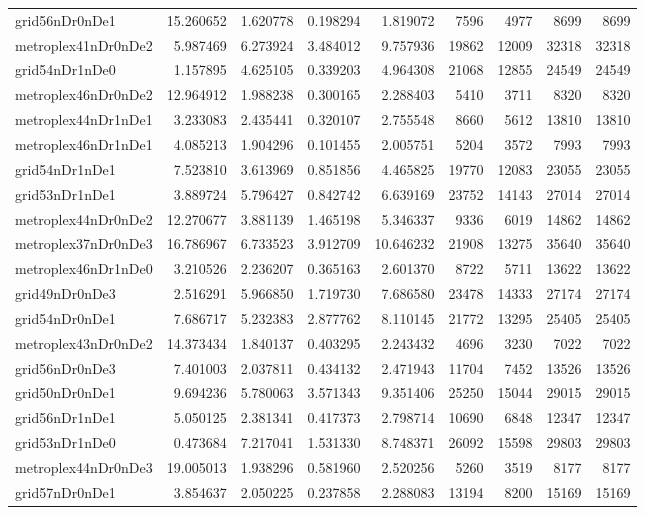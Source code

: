 \begin{longtable}{|l|r|r|r|r|r|r|r|r|}
grid56nDr0nDe1 & 15.260652 & 1.620778 & 0.198294 & 1.819072 & 7596 & 4977 & 8699 & 8699 \\
metroplex41nDr0nDe2 & 5.987469 & 6.273924 & 3.484012 & 9.757936 & 19862 & 12009 & 32318 & 32318 \\
grid54nDr1nDe0 & 1.157895 & 4.625105 & 0.339203 & 4.964308 & 21068 & 12855 & 24549 & 24549 \\
metroplex46nDr0nDe2 & 12.964912 & 1.988238 & 0.300165 & 2.288403 & 5410 & 3711 & 8320 & 8320 \\
metroplex44nDr1nDe1 & 3.233083 & 2.435441 & 0.320107 & 2.755548 & 8660 & 5612 & 13810 & 13810 \\
metroplex46nDr1nDe1 & 4.085213 & 1.904296 & 0.101455 & 2.005751 & 5204 & 3572 & 7993 & 7993 \\
grid54nDr1nDe1 & 7.523810 & 3.613969 & 0.851856 & 4.465825 & 19770 & 12083 & 23055 & 23055 \\
grid53nDr1nDe1 & 3.889724 & 5.796427 & 0.842742 & 6.639169 & 23752 & 14143 & 27014 & 27014 \\
metroplex44nDr0nDe2 & 12.270677 & 3.881139 & 1.465198 & 5.346337 & 9336 & 6019 & 14862 & 14862 \\
metroplex37nDr0nDe3 & 16.786967 & 6.733523 & 3.912709 & 10.646232 & 21908 & 13275 & 35640 & 35640 \\
metroplex46nDr1nDe0 & 3.210526 & 2.236207 & 0.365163 & 2.601370 & 8722 & 5711 & 13622 & 13622 \\
grid49nDr0nDe3 & 2.516291 & 5.966850 & 1.719730 & 7.686580 & 23478 & 14333 & 27174 & 27174 \\
grid54nDr0nDe1 & 7.686717 & 5.232383 & 2.877762 & 8.110145 & 21772 & 13295 & 25405 & 25405 \\
metroplex43nDr0nDe2 & 14.373434 & 1.840137 & 0.403295 & 2.243432 & 4696 & 3230 & 7022 & 7022 \\
grid56nDr0nDe3 & 7.401003 & 2.037811 & 0.434132 & 2.471943 & 11704 & 7452 & 13526 & 13526 \\
grid50nDr0nDe1 & 9.694236 & 5.780063 & 3.571343 & 9.351406 & 25250 & 15044 & 29015 & 29015 \\
grid56nDr1nDe1 & 5.050125 & 2.381341 & 0.417373 & 2.798714 & 10690 & 6848 & 12347 & 12347 \\
grid53nDr1nDe0 & 0.473684 & 7.217041 & 1.531330 & 8.748371 & 26092 & 15598 & 29803 & 29803 \\
metroplex44nDr0nDe3 & 19.005013 & 1.938296 & 0.581960 & 2.520256 & 5260 & 3519 & 8177 & 8177 \\
grid57nDr0nDe1 & 3.854637 & 2.050225 & 0.237858 & 2.288083 & 13194 & 8200 & 15169 & 15169 \\

\end{longtable}
